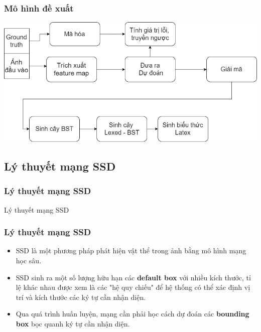 \documentclass{beamer}
\begin{document}
	\begin{frame}
		\frametitle{Mô hình đề xuất}
		
		\begin{center}
			\centering
			\includegraphics[width=0.95\linewidth]{pipeline.png}
			\vspace{0.5cm}
		\end{center}
	\end{frame}
	
	\subsection{Lý thuyết mạng SSD}
	
	\begin{frame}
		\frametitle{Lý thuyết mạng SSD}
		{\Huge Lý thuyết mạng SSD}
	\end{frame}
	
	\begin{frame}
		\frametitle{Lý thuyết mạng SSD}
		
		\begin{itemize}
			\item SSD là một phương pháp phát hiện vật thể trong ảnh bằng mô hình mạng học sâu.
			\item SSD sinh ra một số lượng hữu hạn các \textbf{default box} với nhiều kích thước, tỉ lệ khác nhau được xem là các "hệ quy chiếu" để hệ thống có thể xác định vị trí và kích thước các ký tự cần nhận diện. 
			\item Qua quá trình huấn luyện, mạng cần phải học cách dự đoán các \textbf{bounding box} bọc quanh ký tự cần nhận diện.
		\end{itemize}
	\end{frame}
	
\end{document}
